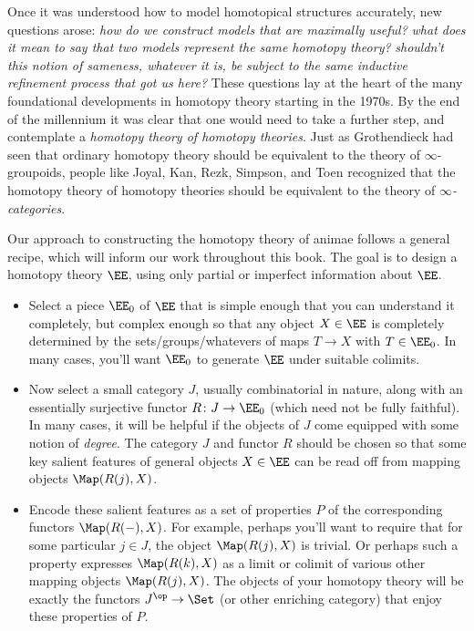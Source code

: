 Once it was understood how to model homotopical structures accurately, new questions arose:
\emph{how do we construct models that are maximally useful?}
\emph{what does it mean to say that two models represent the same homotopy theory?}
\emph{shouldn't this notion of sameness, whatever it is, be subject to the same inductive refinement process that got us here?}
These questions lay at the heart of the many foundational developments in homotopy theory starting in the 1970s.
By the end of the millennium it was clear that one would need to take a further step, and contemplate a \emph{homotopy theory of homotopy theories}.
Just as Grothendieck had seen that ordinary homotopy theory should be equivalent to the theory of $\infty$-groupoids,
people like Joyal, Kan, Rezk, Simpson, and Toen recognized that the homotopy theory of homotopy theories should be equivalent to the theory of \emph{$\infty$-categories}.

Our approach to constructing the homotopy theory of animae follows a general recipe, which will inform our work throughout this book.
The goal is to design a homotopy theory $\EE$, using only partial or imperfect information about $\EE$.
\begin{itemize}
  \item%
    Select a piece $\EE_0$ of $\EE$ that is simple enough that you can understand it completely,
    but complex enough so that any object $X \in \EE$ is completely determined by the sets/groups/whatevers of maps $T \to X$ with $T \in \EE_0$.
    In many cases, you'll want $\EE_0$ to generate $\EE$ under suitable colimits.
  \item%
    Now select a small category $J$, usually combinatorial in nature,
    along with an essentially surjective functor $R \colon J \to \EE_0$ (which need not be fully faithful).
    In many cases, it will be helpful if the objects of $J$ come equipped with some notion of \emph{degree}.
    The category $J$ and functor $R$ should be chosen so that some key salient features of general objects $X \in \EE$ can be read off from mapping objects $\Map(R(j),X)$.
  \item%
    Encode these salient features as a set of properties $P$ of the corresponding functors $\Map(R(-),X)$.
    For example, perhaps you'll want to require that for some particular $j \in J$, the object $\Map(R(j),X)$ is trivial.
    Or perhaps such a property expresses $\Map(R(k),X)$ as a limit or colimit of various other mapping objects $\Map(R(j),X)$.
    The objects of your homotopy theory will be exactly the functors $J^{\op} \to \Set$ (or other enriching category) that enjoy these properties of $P$.
\end{itemize}

